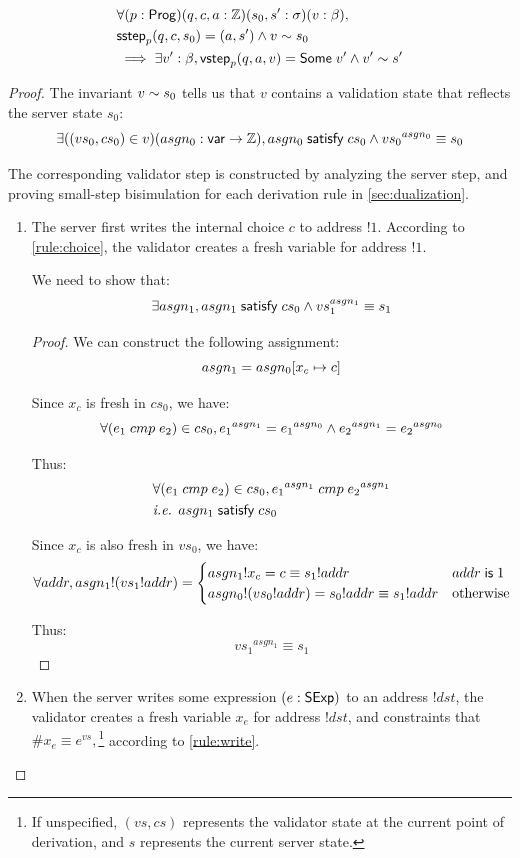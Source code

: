 \begin{lemma}[\ref{eq:rs2}]
  \begin{align*}
    &\forall(p:\mathsf{Prog})(q,c,a:\mathbb Z)(s_0,s':\sigma)(v:\beta),\\
    &\mathsf{sstep}_p(q,c,s_0)=(a,s')\wedge v\sim s_0\\
    &\implies\exists v':\beta,\mathsf{vstep}_p(q,a,v)=\mathsf{Some}\;v'\wedge v'\sim s'
  \end{align*}
\end{lemma}
\begin{proof}
The invariant $v\sim s_0$ tells us that $v$ contains a validation state
that reflects the server state $s_0$:
\[\exists((vs_0,cs_0)\in v)(asgn_0:\mathsf{var}\to\mathbb Z),asgn_0\;\mathsf{satisfy}\;cs_0\wedge {vs_0}^{asgn_0}\equiv s_0\]

The corresponding validator step is constructed by analyzing the server step,
and proving small-step bisimulation for each derivation rule
in \autoref{sec:dualization}.
\begin{enumerate}
\item The server first writes the internal choice $c$ to address $!1$.
According to \autoref{rule:choice}, the validator creates a fresh variable for
address $!1$.

We need to show that:
\[\exists asgn_1,asgn_1\;\mathsf{satisfy}\;cs_0\wedge vs_1^{asgn_1}\equiv s_1\]

\begin{proof}
We can construct the following assignment:
\[asgn_1=asgn_0[x_c\mapsto c]\]

Since $x_c$ is fresh in $cs_0$, we have:
\[\forall (e_1\;cmp\; e_2)\in cs_0,{e_1}^{asgn_1}={e_1}^{asgn_0}\wedge{e_2}^{asgn_1}={e_2}^{asgn_0}\]

Thus:
\begin{align*}
&\forall (e_1\;cmp\; e_2)\in cs_0, {e_1}^{asgn_1}\;cmp\; {e_2}^{asgn_1}\\
&\textit{i.e. }asgn_1\;\mathsf{satisfy}\;cs_0
\end{align*}

Since $x_c$ is also fresh in $vs_0$, we have:
\[\forall addr, asgn_1!(vs_1!addr)=\begin{cases}
asgn_1!x_c=c\equiv s_1!addr&addr\;\mathsf{is}\;1\\
asgn_0!(vs_0!addr)=s_0!addr\equiv s_1!addr&\text{otherwise}
\end{cases}\]

Thus: \[{vs_1}^{asgn_1}\equiv s_1\]
\end{proof}

\item When the server writes some expression $(e:\mathsf{SExp})$ to an address $!dst$,
the validator creates a fresh variable $x_e$ for address $!dst$, and constraints
that $\#x_e\equiv e^{vs},$\footnote{If unspecified, $(vs,cs)$ represents the
validator state at the current point of derivation, and $s$ represents the
current server state.} according to \autoref{rule:write}.


\end{enumerate}
\end{proof}
